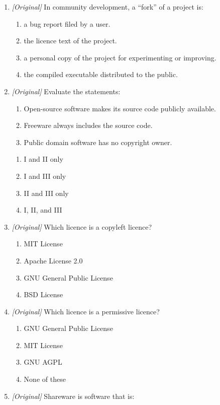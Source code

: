 \begin{enumerate}[label=\textbf{Q\arabic*.}, leftmargin=*]
\item \textit{[Original]} In community development, a ``fork'' of a project is:
  \begin{enumerate}[label=\Alph*.]
    \item a bug report filed by a user.
    \item the licence text of the project.
    \item a personal copy of the project for experimenting or improving.
    \item the compiled executable distributed to the public.
  \end{enumerate}
\item \textit{[Original]} Evaluate the statements:
  \begin{enumerate}[label=\Roman*.]
    \item Open-source software makes its source code publicly available.
    \item Freeware always includes the source code.
    \item Public domain software has no copyright owner.
  \end{enumerate}
  \begin{enumerate}[label=\Alph*.]
    \item I and II only
    \item I and III only
    \item II and III only
    \item I, II, and III
  \end{enumerate}
\item \textit{[Original]} Which licence is a copyleft licence?
  \begin{enumerate}[label=\Alph*.]
    \item MIT License
    \item Apache License 2.0
    \item GNU General Public License
    \item BSD License
  \end{enumerate}
\item \textit{[Original]} Which licence is a permissive licence?
  \begin{enumerate}[label=\Alph*.]
    \item GNU General Public License
    \item MIT License
    \item GNU AGPL
    \item None of these
  \end{enumerate}
\item \textit{[Original]} Shareware is software that is:

\end{enumerate}
